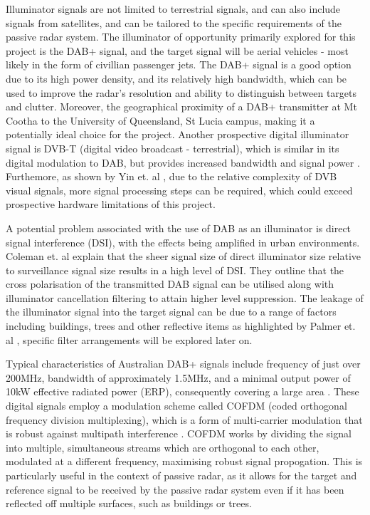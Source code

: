 \documentclass[12pt,a4paper]{article}
\begin{document}
Illuminator signals are not limited to terrestrial signals, and can also include signals from satellites, and can be tailored to the specific requirements of the passive radar system. The illuminator of opportunity primarily explored for this project is the DAB+ signal, and the target signal will be aerial vehicles - most likely in the form of civillian passenger jets. The DAB+ signal is a good option due to its high power density, and its relatively high bandwidth, which can be used to improve the radar's resolution and ability to distinguish between targets and clutter. Moreover, the geographical proximity of a DAB+ transmitter at Mt Cootha to the University of Queensland, St Lucia campus, making it a potentially ideal choice for the project. Another prospective digital illuminator signal is DVB-T (digital video broadcast - terrestrial), which is similar in its digital modulation to DAB, but provides increased bandwidth and signal power \cite{DVBsignal}. Furthemore, as shown by Yin et. al \cite{DVBnoise}, due to the relative complexity of  DVB visual signals, more signal processing steps can be required, which could exceed prospective hardware limitations of this project.

\par \vspace{0.5cm} 
\noindent A potential problem associated with the use of DAB as an illuminator is direct signal interference (DSI), with the effects being amplified in urban environments. Coleman et. al \cite{DABfeatures} explain that the sheer signal size of direct illuminator size relative to surveillance signal size results in a high level of DSI. They outline that the cross polarisation of the transmitted DAB signal can be utilised along with illuminator cancellation filtering to attain higher level suppression. The leakage of the illuminator signal into the target signal can be due to a range of factors including buildings, trees and other reflective items as highlighted by Palmer et. al \cite{DTSO2009}, specific filter arrangements will be explored later on.

\par \vspace{0.5cm} 
\noindent Typical characteristics of Australian DAB+ signals include frequency of just over 200MHz, bandwidth of approximately 1.5MHz, and a minimal output power of 10kW effective radiated power (ERP), consequently covering a large area \cite{DABfeatures}. These digital signals employ a modulation scheme called COFDM (coded orthogonal frequency division multiplexing), which is a form of multi-carrier modulation that is robust against multipath interference \cite{INTRO2017}. COFDM works by dividing the signal into multiple, simultaneous streams which are orthogonal to each other, modulated at a different frequency, maximising robust signal propogation. This is particularly useful in the context of passive radar, as it allows for the target and reference signal to be received by the passive radar system even if it has been reflected off multiple surfaces, such as buildings or trees.
\end{document}
